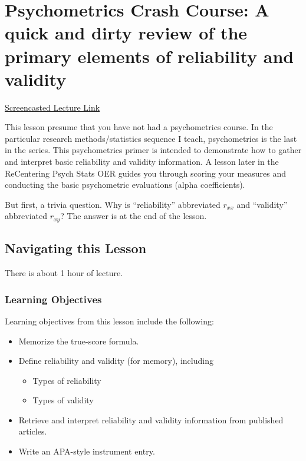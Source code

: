 \documentclass[
  english,
]{book}
\providecommand{\tightlist}{%
  \setlength{\itemsep}{0pt}\setlength{\parskip}{0pt}}
\begin{document}
\hypertarget{Psychometrix}{%
\chapter{Psychometrics Crash Course: A quick and dirty review of the primary elements of reliability and validity}\label{Psychometrix}}

\href{https://spu.hosted.panopto.com/Panopto/Pages/Viewer.aspx?pid=0a485840-5caa-484b-ba16-ac37017d6b05}{Screencasted Lecture Link}

This lesson presume that you have not had a psychometrics course. In the particular research methods/statistics sequence I teach, psychometrics is the last in the series. This psychometrics primer is intended to demonstrate how to gather and interpret basic reliability and validity information. A lesson later in the ReCentering Psych Stats OER guides you through scoring your measures and conducting the basic psychometric evaluations (alpha coefficients).

But first, a trivia question. Why is ``reliability'' abbreviated \(r_{xx}\) and ``validity'' abbreviated \(r_{xy}\)? The answer is at the end of the lesson.

\hypertarget{navigating-this-lesson-5}{%
\section{Navigating this Lesson}\label{navigating-this-lesson-5}}

There is about 1 hour of lecture.

\hypertarget{learning-objectives-5}{%
\subsection{Learning Objectives}\label{learning-objectives-5}}

Learning objectives from this lesson include the following:

\begin{itemize}
\tightlist
\item
  Memorize the true-score formula.
\item
  Define reliability and validity (for memory), including

  \begin{itemize}
  \tightlist
  \item
    Types of reliability
  \item
    Types of validity
  \end{itemize}
\item
  Retrieve and interpret reliability and validity information from published articles.
\item
  Write an APA-style instrument entry.
\end{itemize}
\end{document}
